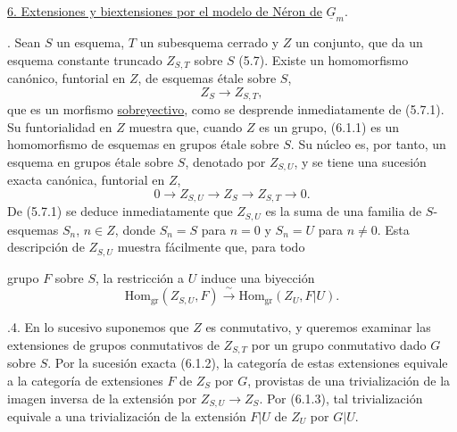 
\medskip
\noindent\underline{6. Extensiones y biextensiones por el modelo de
Néron de} $\underline G_m$.

\medskip
{}. Sean $S$ un esquema, $T$ un subesquema cerrado y $Z$
un conjunto, que da un esquema constante truncado $Z_{S,T}$ sobre $S$
(5.7). Existe un homomorfismo canónico, funtorial en $Z$, de esquemas
étale sobre $S$,
\begin{equation}\tag{6.1.1}
 Z_S\longrightarrow Z_{S,T},
\end{equation}
que es un morfismo \underline{sobreyectivo}, como se desprende
inmediatamente de (5.7.1). Su funtorialidad en $Z$ muestra que, cuando
$Z$ es un grupo, (6.1.1) es un homomorfismo de esquemas en grupos
étale sobre $S$. Su núcleo es, por tanto, un esquema en grupos étale
sobre $S$, denotado por $Z_{S,U}$, y se tiene una sucesión exacta
canónica, funtorial en $Z$,
\begin{equation}\tag{6.1.2}
 0\longrightarrow Z_{S,U}\longrightarrow Z_S\longrightarrow Z_{S,T}
 \longrightarrow0.
\end{equation}
De (5.7.1) se deduce inmediatamente que $Z_{S,U}$ es la suma de una
familia de $S$-esquemas $S_n$, $n\in Z$, donde $S_n=S$ para $n=0$ y
$S_n=U$ para $n\ne0$. Esta descripción de $Z_{S,U}$ muestra fácilmente
que, para todo


grupo $F$ sobre $S$, la restricción a $U$ induce una biyección
\begin{equation}\tag{6.1.3}
 \mathrm{Hom}_{\mathrm{gr}}(Z_{S,U},F)
 \xrightarrow{\ \sim\ }
 \mathrm{Hom}_{\mathrm{gr}}(Z_U,F|U).
\end{equation}

\medskip
{}.4. En lo sucesivo suponemos que $Z$ es conmutativo, y
queremos examinar las extensiones de grupos conmutativos de $Z_{S,T}$
por un grupo conmutativo dado $G$ sobre $S$. Por la sucesión exacta
(6.1.2), la categoría de estas extensiones equivale a la categoría de
extensiones $F$ de $Z_S$ por $G$, provistas de una trivialización de la
imagen inversa de la extensión por $Z_{S,U}\to Z_S$. Por (6.1.3), tal
trivialización equivale a una trivialización de la extensión $F|U$ de
$Z_U$ por $G|U$.

